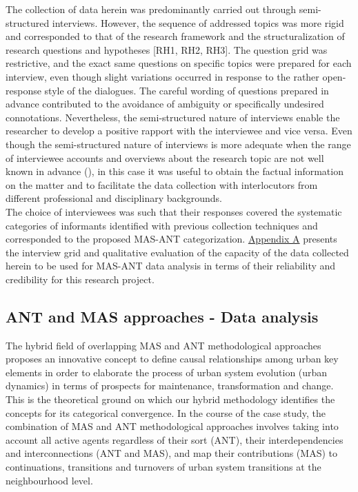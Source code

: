 \documentclass[11pt]{report}
\begin{document}
The collection of data herein was predominantly carried out through semi-structured interviews. However, the sequence of addressed topics was more rigid and corresponded to that of the research framework and the structuralization of research questions and hypotheses [RH1, RH2, RH3].
The question grid was restrictive, and the exact same questions on specific topics were prepared for each interview, even though slight variations occurred in response to the rather open-response style of the dialogues. The careful wording of questions prepared in advance contributed to the avoidance of ambiguity or specifically undesired connotations. Nevertheless, the semi-structured nature of interviews enable the researcher to develop a positive rapport with the interviewee and vice versa. Even though the semi-structured nature of interviews is more adequate when the range of interviewee accounts and overviews about the research topic are not well known in advance (\href{King}{\citealt{cassell_qualitative_1994}}), in this case it was useful to obtain the factual information on the matter and to facilitate the data collection with  interlocutors from different professional and disciplinary backgrounds. 
\\

The choice of interviewees was such that their responses covered the systematic categories of informants identified with previous collection techniques and corresponded to the proposed  MAS-ANT categorization. \href{Appendix A}{Appendix A} presents the interview grid and qualitative evaluation of the capacity of the data collected herein to be used for MAS-ANT data analysis in terms of their reliability and credibility for this research project.

\subsection{ANT and MAS approaches - Data analysis}

The hybrid field of overlapping MAS and ANT methodological approaches proposes an innovative concept to define causal relationships among urban key elements in order to elaborate the process of urban system evolution (urban dynamics) in terms of prospects for maintenance, transformation and change. This is the theoretical ground on which our hybrid methodology identifies the concepts for its categorical convergence. In the course of the case study, the combination of MAS and ANT methodological approaches involves taking into account all active agents regardless of their sort (ANT), their interdependencies and interconnections (ANT and MAS), and map their contributions (MAS) to continuations, transitions and turnovers of urban system transitions at the neighbourhood level.    
\end{document}
